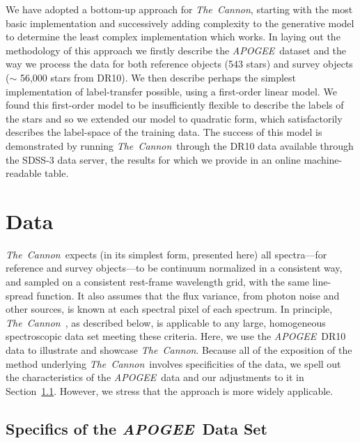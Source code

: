 \documentclass[12pt, preprint]{aastex}
\newcommand{\sectionname}{Section}
\newcommand{\tc}{\textsl{The~Cannon}}
\newcommand{\apogee}{\textsl{APOGEE}}
\begin{document}
We have adopted a bottom-up approach for \tc, starting with the most basic implementation and successively adding complexity to the generative model to determine the least complex implementation which works.  
In laying out the methodology of this approach we firstly describe the \apogee\ dataset and the way we process the data for both reference objects (543 stars) and survey objects ($\sim$ 56,000 stars from DR10). 
We then describe perhaps the simplest implementation of label-transfer possible, using a first-order linear model. We found this first-order model to be insufficiently flexible to describe the labels of the stars and so we extended our model to quadratic form, which satisfactorily describes the label-space of the training data.
The success of this model is demonstrated by running \tc\ through the DR10 data available through the SDSS-3 data server, the results for which we provide in an online machine-readable table. %

\section{Data}\label{sec:Data}
\tc\ expects (in its simplest form, presented here)
all spectra---for reference and survey objects---to be continuum normalized in a consistent way,
and sampled on a consistent rest-frame wavelength grid, with the same line-spread function.
It also assumes that the flux variance, from photon noise and other sources, is known at each spectral pixel of each spectrum.
In principle, \tc\ , as described below, is applicable to any large, homogeneous spectroscopic data set
meeting these criteria.
Here, we use the \apogee\ DR10 data \citep{Ahn2014} to illustrate and showcase \tc.
Because all of the exposition of the method underlying \tc\ involves specificities of the data,
we spell out the characteristics of the \apogee\ data and our adjustments to it in \sectionname~\ref{sec:Apogee_as_worked_Example}. However, we stress that the approach is more widely applicable. 

\subsection{Specifics of the \apogee\ Data Set}
\label{sec:Apogee_as_worked_Example}
\end{document}
